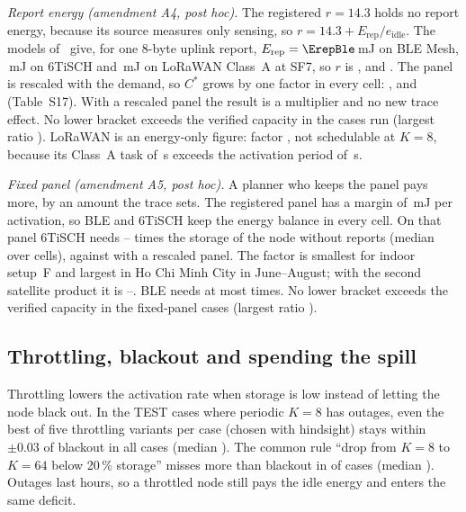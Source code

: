 \emph{Report energy (amendment A4, post hoc).} The registered $r=14.3$ holds no report energy, because its source measures only sensing, so $r=14.3+E_{\mathrm{rep}}/e_{\mathrm{idle}}$. The models of~\cite{vanleemput2023iotj} give, for one 8-byte uplink report, $E_{\mathrm{rep}}=\ErepBle$\,mJ on BLE Mesh, \ErepSix\,mJ on 6TiSCH and \ErepLora\,mJ on LoRaWAN Class~A at SF7, so $r$ is \rBle, \rSix{} and \rLora. The panel is rescaled with the demand, so $C^*$ grows by one factor in every cell: \kBle, \kSix{} and \kLora{} (Table~S17). With a rescaled panel the result is a multiplier and no new trace effect. No lower bracket exceeds the verified capacity in the \AivNcases{} cases run (largest ratio \AivMaxLB). LoRaWAN is an energy-only figure: factor \kLora, not schedulable at $K=8$, because its Class~A task of \TaskLora\,s exceeds the activation period of \ActPeriod\,s.

\emph{Fixed panel (amendment A5, post hoc).} A planner who keeps the panel pays more, by an amount the trace sets. The registered panel has a margin of \PanelMarginQ\,mJ per activation, so BLE and 6TiSCH keep the energy balance in every cell. On that panel 6TiSCH needs \AvSixMin--\AvSixMax{} times the storage of the node without reports (median \AvSixMed{} over \nCellsSS{} cells), against \kSix{} with a rescaled panel. The factor is smallest for indoor setup~F and largest in Ho Chi Minh City in June--August; with the second satellite product it is \AvSixSecMin--\AvSixSecMax. BLE needs at most \AvBleMax{} times. No lower bracket exceeds the verified capacity in the \AvNcases{} fixed-panel cases (largest ratio \AvMaxLB).



\subsection{Throttling, blackout and spending the spill}\label{sec:throttle}
Throttling lowers the activation rate when storage is low instead of letting the node black out. In the \nThr{} TEST cases where periodic $K=8$ has outages, even the best of five throttling variants per case (chosen with hindsight) stays within $\pm0.03$ of blackout in all cases (median \thrMedSigned). The common rule ``drop from $K=8$ to $K=64$ below 20\,\% storage'' misses more than blackout in \naiveSharePct{} of cases (median \naiveMedSigned). Outages last hours, so a throttled node still pays the idle energy and enters the same deficit.

